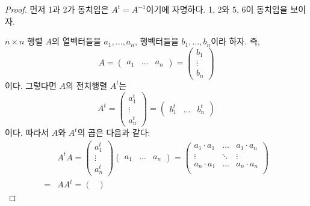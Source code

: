 \documentclass[unfonts,oneside,a4paper]{oblivoir}
\theoremstyle{definition}
\theoremstyle{theorem}
\theoremstyle{theorem}
\theoremstyle{remark}
\theoremstyle{remark}
\theoremstyle{remark}
\theoremstyle{remark}
\renewcommand{\vec}[1]{\bm{\mathit{#1}}}
\begin{document}
\begin{proof}
    먼저 1과 2가 동치임은 $A^t = A^{-1}$이기에 자명하다.
    1, 2와 5, 6이 동치임을 보이자.

    $n \times n$ 행렬 $A$의 열벡터들을 $\vec a_1, \dots, \vec a_n$, 행벡터들을 $\vec b_1, \dots, \vec b_n$이라 하자.
    즉,
    \begin{equation*}
        A =
        \begin{pmatrix}
            \vec a_1 & \dots & \vec a_n
        \end{pmatrix}
        =
        \begin{pmatrix}
            \vec b_1 \\ \vdots \\ \vec b_n
        \end{pmatrix}
    \end{equation*}
    이다.
    그렇다면 $A$의 전치행렬 $A^t$는
    \begin{equation*}
        A^t =
        \begin{pmatrix}
            \vec a_1^t \\ \vdots \\ \vec a_n^t
        \end{pmatrix}
        =
        \begin{pmatrix}
            \vec b_1^t & \dots & \vec b_n^t
        \end{pmatrix}
    \end{equation*}
    이다.
    따라서 $A$와 $A^t$의 곱은 다음과 같다:
    \begin{align*}
        &A^tA =
        \begin{pmatrix}
            \vec a_1^t \\ \vdots \\ \vec a_n^t
        \end{pmatrix}
        \begin{pmatrix}
            \vec a_1 & \dots & \vec a_n
        \end{pmatrix}
        =
        \begin{pmatrix}
            \vec a_1 \cdot \vec a_1 & \dots & \vec a_1 \cdot \vec a_n\\
            \vdots & \ddots & \vdots\\
            \vec a_n \cdot \vec a_1 & \dots & \vec a_n \cdot \vec a_n\\
        \end{pmatrix}
        \\
        = &AA^t =
        \begin{pmatrix}

\end{pmatrix}
\end{align*}
\end{proof}
\end{document}
